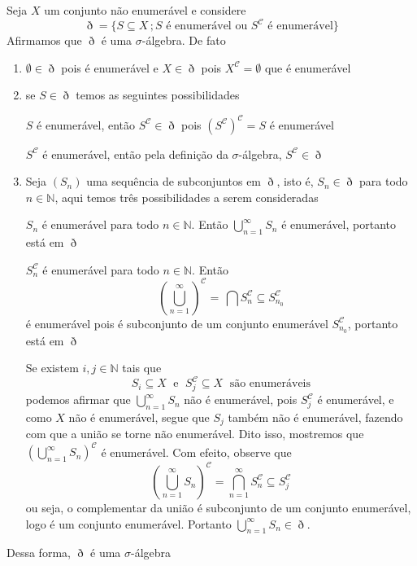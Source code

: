 \documentclass[a4paper, 11pt]{book}
\theoremstyle{definition}
\newcommand{\obs}{\noindent{\textbf{\textcolor{black}{\sffamily Observação:}}}~}
\newcommand{\bN}{\mathbb{N}}
\newcommand{\cC}{\mathcal{C}}
\begin{document}
\obs

\obs

\begin{ex}
    Seja $X$ um conjunto não enumerável e considere
    \[
        \eth = \{ S \subseteq X \,; \text{$S$ é enumerável ou $S^{\mathcal{C}}$ é enumerável} \}
    \]
    Afirmamos que $\eth$ é uma $\sigma$-álgebra. De fato
    \begin{enumerate}[leftmargin=*]
        \item $\emptyset \in \eth$ pois é enumerável e $X \in \eth$ pois $X^\cC = \emptyset$ que é enumerável

        \item se $S \in \eth$ temos as seguintes possibilidades

        $S$ é enumerável, então $S^\cC \in \eth$ pois $(S^\cC)^\cC = S$ é enumerável

        $S^\cC$ é enumerável, então pela definição da $\sigma$-álgebra, $S^\cC \in \eth$

        \item Seja $(S_n)$ uma sequência de subconjuntos em $\eth$, isto é, $S_n \in \eth$ para todo $n \in \bN$, aqui temos três possibilidades a serem consideradas
        
        $S_n$ é enumerável para todo $n \in \bN$. Então $\bigcup_{n=1}^\infty S_n$ é enumerável, portanto está em $\eth$

        $S_n^\cC$ é enumerável para todo $n \in \bN$. Então
        \[
            \left( \bigcup_{n=1}^\infty \right)^\cC \!\! = \, \bigcap S_n^\cC \subseteq S_{n_0}^\cC
        \]
        é enumerável pois é subconjunto de um conjunto enumerável $S_{n_0}^\cC$, portanto está em $\eth$

        Se existem $i,j \in \bN$ tais que
        \[
            S_i \subseteq X \;\text{ e }\; S_j^\cC \subseteq X \;\text{ são enumeráveis}
        \]
        podemos afirmar que $\bigcup_{n=1}^\infty S_n$ não é enumerável, pois $S_j^\cC$ é enumerável, e como $X$ não é enumerável, segue que $S_j$ também não é enumerável, fazendo com que a união se torne não enumerável. Dito isso, mostremos que $ \left( \bigcup_{n=1}^\infty S_n \right)^\cC$ é enumerável. Com efeito, observe que
        \[
            \left( \bigcup_{n=1}^\infty S_n \right)^\cC = \bigcap_{n=1}^\infty S_n^\cC \subseteq S_j^\cC
        \]
        ou seja, o complementar da união é subconjunto de um conjunto enumerável, logo é um conjunto enumerável. Portanto $\bigcup_{n=1}^\infty S_n \in \eth$.
    \end{enumerate}
    Dessa forma, $\eth$ é uma $\sigma$-álgebra
\end{ex}
\end{document}

